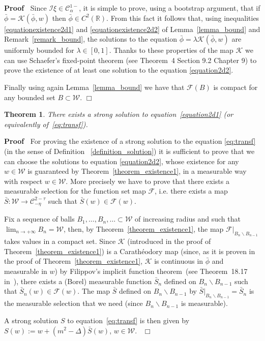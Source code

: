 \documentclass[a4paper,10pt]{article}
\newcommand{\assign}{:=}
\newcommand{\nobracket}{}
\newenvironment{proof}{\noindent\textbf{Proof\ }}{\hspace*{\fill}$\Box$\medskip}
\newtheorem{theorem}{Theorem}
\begin{document}
\begin{proof}
  Since $\mathcal{I} \xi \in \mathcal{C}^{1 -}_{\alpha}$, it is simple to
  prove, using a bootstrap argument, that if $\bar{\phi} = \mathcal{K}
  (\bar{\phi}, w)$ then $\bar{\phi} \in C^2 (\mathbb{R})$. From this fact it
  follows that, using inequalities {\eqref{equationexistence2d1}} and
  {\eqref{equationexistence2d2}} of Lemma~\ref{lemma_bound} and
  Remark~\ref{remark_bound}, the solutions to the equation $\bar{\phi} =
  \lambda \mathcal{K} (\bar{\phi}, w) \mathcal{}$ are uniformly bounded for
  $\lambda \in [0, 1]$. Thanks to these properties of the map $\mathcal{K}$ we
  can use Schaefer's fixed-point theorem (see {\cite{Evans1998}} Theorem~4
  Section 9.2 Chapter 9) to prove the existence of at least one solution to
  the equation {\eqref{equation2d2}}.
  
  Finally using again Lemma~\ref{lemma_bound} we have that $\mathcal{F} (B)$
  is compact for any bounded set $B \subset \mathcal{W}$.
\end{proof}

\begin{theorem}
  \label{theorem_existence2}There exists a strong solution to
  equation~{\eqref{equation2d1}} (or equivalently of~{\eqref{eq:transf}}).
\end{theorem}

\begin{proof}
  For proving the existence of a strong solution to the equation
  {\eqref{eq:transf}} (in the sense of Definition ~\ref{definition_solution})
  it is sufficient to prove that we can choose the solutions to equation
  {\eqref{equation2d2}}, whose existence for any $w \in \mathcal{W}$ is
  guaranteed by Theorem~\ref{theorem_existence1}, in a measurable way with
  respect $w \in \mathcal{W}$. More precisely we have to prove that there
  exists a measurable selection for the function set map $\mathcal{F}$, i.e.
  there exists a map $\bar{S} : \mathcal{W} \rightarrow \mathcal{C}^{2 -
  \tau}_{- \eta}$ such that $\bar{S} (w) \in \mathcal{F} (w)$.
  
  Fix a sequence of balls $B_1, \ldots, B_n, \ldots \subset \mathcal{W}$ of
  increasing radius and such that $\lim_{n \rightarrow + \infty} B_n
  =\mathcal{W}$, then, by Theorem~\ref{theorem_existence1}, the map
  $\nobracket \mathcal{F} |_{B_n \backslash B_{n - 1}}$ takes values in a
  compact set. Since $\mathcal{K}$ (introduced in the proof of
  Theorem~\ref{theorem_existence1}) is a Carath{\'e}odory map (since, as it is
  proven in the proof of Theorem~\ref{theorem_existence1}, $\mathcal{K}$ is
  continuous in $\bar{\phi}$ and measurable in $w$) by Filippov's implicit
  function theorem~(see Theorem~18.17 in~{\cite{Aliprantis2006}}), there
  exists a (Borel) measurable function $\bar{S}_n$ defined on $B_n \backslash
  B_{n - 1}$ such that $\bar{S}_n (w) \in \mathcal{F} (w)$. The map $\bar{S}$
  defined on $B_n \backslash B_{n - 1}$ by $\nobracket \bar{S} |_{B_n
  \backslash B_{n - 1}} = \bar{S}_n$ is the measurable selection that we need
  (since $B_n \backslash B_{n - 1}$ is measurable).
  
  A strong solution $S$ to equation~{\eqref{eq:transf}} is then given by $S
  (w) \assign w + (m^2 - \Delta) \bar{S} (w)$, $w \in \mathcal{W}$. \ 
\end{proof}
\end{document}
